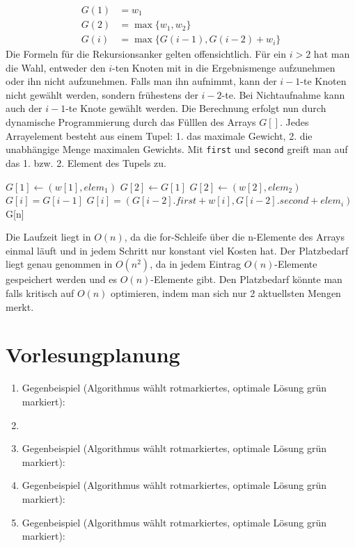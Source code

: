 \documentclass[a4paper,10pt]{scrartcl}
\begin{document}
\begin{enumerate}
  \begin{align*}
            G(1) &= w_1 \\
            G(2) &= \max\{w_1,w_2\} \\
            G(i) &= \max\{G(i-1), G(i-2) + w_i\} 
   \end{align*}
  Die Formeln für die Rekursionsanker gelten offensichtlich. Für ein $i > 2$ hat man die Wahl, entweder den $i$-ten Knoten mit in die Ergebnismenge aufzunehmen oder ihn nicht aufzunehmen.
  Falls man ihn aufnimmt, kann der $i-1$-te Knoten nicht gewählt werden, sondern frühestens der $i - 2$-te. Bei Nichtaufnahme kann auch der $i-1$-te Knote gewählt werden.
  Die Berechnung erfolgt nun durch dynamische Programmierung durch das Fülllen des Arrays $G[]$. Jedes Arrayelement besteht aus einem Tupel: 1. das maximale Gewicht, 2. die unabhängige Menge maximalen Gewichts.
  Mit \verb!first! und \verb!second! greift man auf das 1. bzw. 2. Element des Tupels zu.
\begin{algorithmic}
      \STATE $G[1] \gets (w[1], elem_1)$
	\STATE $G[2] \gets G[1]$
      \ELSE
	\STATE $G[2] \gets (w[2], elem_2)$
      \ENDIF
	  \STATE $G[i] = G[i - 1]$
	\ELSE
	  \STATE $G[i] = (G[i - 2].first + w[i], G[i - 2].second + elem_i)$
	\ENDIF
    \ENDFOR
    \RETURN G[n]
  \end{algorithmic}
Die Laufzeit liegt in $O(n)$, da die for-Schleife über die n-Elemente des Arrays einmal läuft und in jedem Schritt nur konstant viel Kosten hat. Der Platzbedarf liegt genau genommen in $O(n^2)$,
da in jedem Eintrag $O(n)$-Elemente gespeichert werden und es $O(n)$-Elemente gibt. Den Platzbedarf könnte man falls kritisch auf $O(n)$ optimieren, indem man sich nur 2 aktuellsten Mengen merkt.
\end{enumerate}
\section{Vorlesungplanung}
\begin{enumerate}
 \item Gegenbeispiel (Algorithmus wählt rotmarkiertes, optimale Lösung grün markiert):
  \vfill

  \item
  \item Gegenbeispiel (Algorithmus wählt rotmarkiertes, optimale Lösung grün markiert):
 \vfill

\item Gegenbeispiel (Algorithmus wählt rotmarkiertes, optimale Lösung grün markiert):

 \vfill
\item Gegenbeispiel (Algorithmus wählt rotmarkiertes, optimale Lösung grün markiert):

 \vfill
\end{enumerate}
\end{document}
